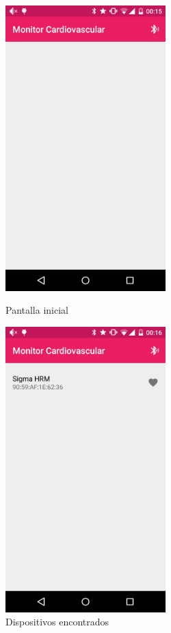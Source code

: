     
\begin{figure}[h] \centering
\begin{minipage}{0.45\textwidth}\centering
    \includegraphics[height=11cm]{graphs/AndroidInicial.png} \caption{Pantalla inicial}\label{fig:screen:initialState}
\end{minipage}
\hfill
 \begin{minipage}{0.45\textwidth}\centering
    \includegraphics[height=11cm]{graphs/AndroidEscaneo.png} \caption{Dispositivos encontrados}\label{fig:screen:scanning}
\end{minipage}
\end{figure}
    
